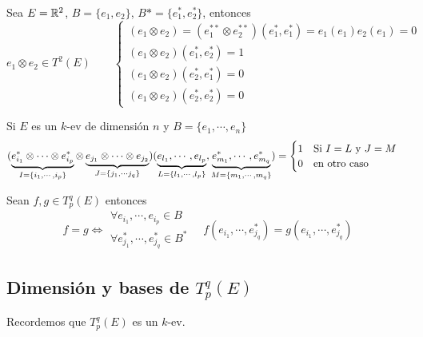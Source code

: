 \begin{example}
	Sea $E = \mathbb{R}^2$, $B = \{e_1, e_2\}$, $B* = \{e_1^*, e_2^*\}$, entonces
	\[
	e_1 \otimes e_2 \in T^2(E) \qquad \begin{cases}
	(e_1 \otimes e_2) = (e_1^{**} \otimes e_2^{**})(e_1^*,e_1^*) =
	e_1(e_1)e_2(e_1) = 0 \\
	(e_1 \otimes e_2)(e_1^*,e_2^*) = 1 \\
	(e_1 \otimes e_2)(e_2^*,e_1^*) = 0 \\
	(e_1 \otimes e_2)(e_2^*,e_2^*) = 0
	\end{cases}
	\]
\end{example}
\begin{obs}[a] \label{obs:tens_cero}
	Si $E$ es un $k$-ev de dimensión $n$ y $B = \{e_1, \cdots, e_n\}$
	\[
	(\underbrace{e_{i_1}^* \otimes \cdots \otimes e_{i_p}^*}_
	{I = \{i_1, \cdots, i_p\}} \otimes
	\underbrace{e_{j_1} \otimes \cdots \otimes e_{j_2}}_
	{J = \{j_1, \cdots j_q\}})(\underbrace{e_{l_1}, \cdots, e_{l_p}}_
	{L = \{l_1, \cdots, l_p\}}, \underbrace{e_{m_1}^*, \cdots, e_{m_q}^*}_
	{M = \{m_1, \cdots, m_q\}}) =
	\begin{cases}
	1 \quad \text{Si } I = L \text{ y } J = M \\
	0 \quad \text{en otro caso}
	\end{cases}
	\]
\end{obs}
\begin{obs}
	Sean $f,g \in T_p^q(E)$ entonces
	\[
	f=g \iff \substack{\forall e_{i_1}, \cdots, e_{i_p} \in B \\ \forall e_{j_1}^*, \cdots,
		e_{j_q}^* \in B^*} \quad f(e_{i_1}, \cdots, e_{j_q}^*) =
	g(e_{i_1}, \cdots, e_{j_q}^*)
	\]
\end{obs}

\subsection{Dimensión y bases de $T_p^q(E)$}

Recordemos que $T_p^q(E)$ es un $k$-ev.

